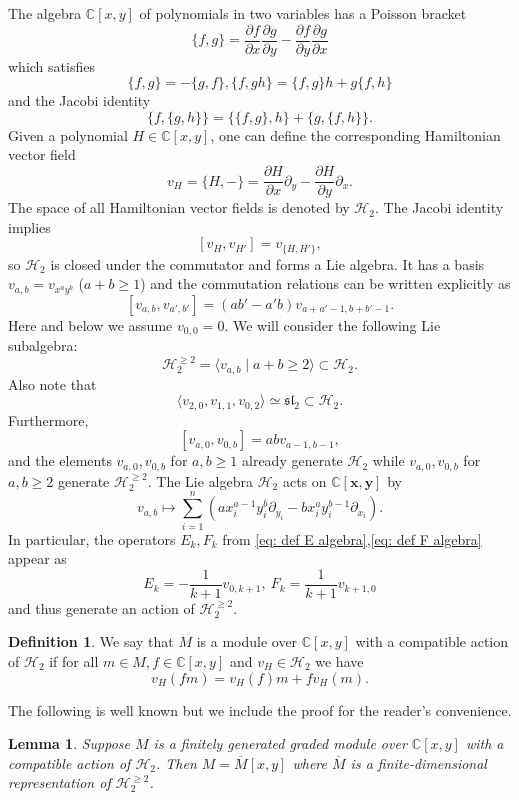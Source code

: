 \documentclass{amsart}
\newcommand{\C}{\mathbb{C}}
\newcommand{\xx}{\mathbf{x}}
\newcommand{\yy}{\mathbf{y}}
\numberwithin{equation}{section}
\newtheorem{lemma}[theorem]{Lemma}
\theoremstyle{definition}
\newtheorem{definition}[theorem]{Definition}
\begin{document}
The algebra $\C[x,y]$ of polynomials in two variables has a Poisson bracket 
$$
\{f,g\}=\frac{\partial f}{\partial x}\frac{\partial g}{\partial y}-\frac{\partial f}{\partial y}\frac{\partial g}{\partial x}
$$
which satisfies
$$
\{f,g\}=-\{g,f\},\{f,gh\}=\{f,g\}h+g\{f,h\} 
$$
and the Jacobi identity
$$
\{f,\{g,h\}\}=\{\{f,g\},h\}+\{g,\{f,h\}\}.
$$
Given a polynomial $H\in \C[x,y]$, one can define the corresponding Hamiltonian vector field
$$
v_H=\{H,-\}=\frac{\partial H}{\partial x}\partial_{y}-\frac{\partial H}{\partial y}\partial_{x}.
$$
The space of all Hamiltonian vector fields is denoted by $\mathcal{H}_2$. The Jacobi identity implies
$$
[v_H,v_{H'}]=v_{\{H,H'\}},
$$
so $\mathcal{H}_2$ is closed under the commutator and forms a Lie algebra. It has a basis $v_{a,b}=v_{x^ay^b}$ ($a+b\ge 1$) and the commutation relations can be written explicitly as
$$
[v_{a,b},v_{a',b'}]=(ab'-a'b)v_{a+a'-1,b+b'-1}.
$$
Here and below we assume $v_{0,0}=0$.
We will consider the following  Lie subalgebra: 
$$
\mathcal{H}_2^{\ge 2}=\langle v_{a,b}\mid a+b\ge 2\rangle\subset \mathcal{H}_2.
$$
Also note that 
$$
\langle v_{2,0},v_{1,1},v_{0,2}\rangle\simeq \mathfrak{sl}_2\subset \mathcal{H}_2.
$$
Furthermore,
$$
[v_{a,0},v_{0,b}]=abv_{a-1,b-1},
$$
and the elements $v_{a,0},v_{0,b}$ for $a,b\ge 1$ already generate $\mathcal{H}_2$ while $v_{a,0},v_{0,b}$ for $a,b\ge 2$ generate $\mathcal{H}_2^{\ge 2}$.  
The Lie algebra $\mathcal{H}_2$ acts on $\C[\xx,\yy]$ by 
$$
v_{a,b}\mapsto \sum_{i=1}^{n}\left(ax_i^{a-1}y_i^b\partial_{y_i}-bx_i^ay_i^{b-1}\partial_{x_i}\right).
$$
In particular, the operators $E_k,F_k$ from \eqref{eq: def E algebra},\eqref{eq: def F algebra} appear as
$$
E_k=-\frac{1}{k+1}v_{0,k+1},\ F_k=\frac{1}{k+1}v_{k+1,0}
$$
and thus generate an action of $\mathcal{H}_2^{\ge 2}$.

\begin{definition}
We say that $M$ is a module over $\C[x,y]$ with a compatible action of $\mathcal{H}_2$ if for all $m\in M, f\in \C[x,y]$ and $v_H\in \mathcal{H}_2$ we have
$$
v_H(fm)=v_H(f)m+fv_H(m).
$$
\end{definition}

The following is well known but we include the proof for the reader's convenience.

\begin{lemma}
\label{lem: reduced}
Suppose $M$ is a finitely generated graded module over $\C[x,y]$ with a compatible action of $\mathcal{H}_2$. Then $M=\overline{M}[x,y]$ where $\overline{M}$ is a finite-dimensional representation of $\mathcal{H}_2^{\ge 2}$.
\end{lemma}
\end{document}
